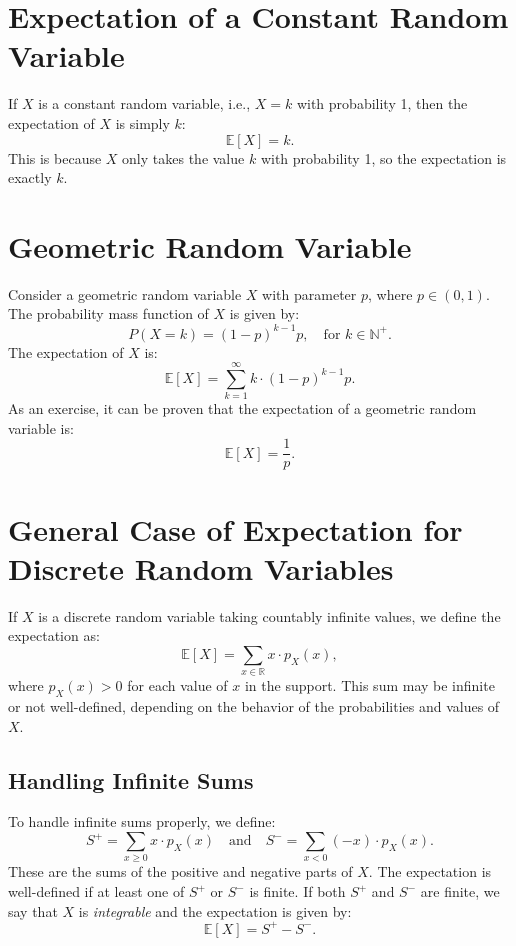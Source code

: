         \section{Expectation of a Constant Random Variable}
    If $X$ is a constant random variable, i.e., $X = k$ with probability 1, then the expectation of $X$ is simply $k$:
    \[
    \mathbb{E}[X] = k.
    \]
    This is because $X$ only takes the value $k$ with probability 1, so the expectation is exactly $k$.
    
    \section{Geometric Random Variable}
    Consider a geometric random variable $X$ with parameter $p$, where $p \in (0, 1)$. The probability mass function of $X$ is given by:
    \[
    P(X = k) = (1 - p)^{k-1} p, \quad \text{for } k \in \mathbb{N}^+.
    \]
    The expectation of $X$ is:
    \[
    \mathbb{E}[X] = \sum_{k=1}^{\infty} k \cdot (1 - p)^{k-1} p.
    \]
    As an exercise, it can be proven that the expectation of a geometric random variable is:
    \[
    \mathbb{E}[X] = \frac{1}{p}.
    \]
    
    \section{General Case of Expectation for Discrete Random Variables}
    If $X$ is a discrete random variable taking countably infinite values, we define the expectation as:
    \[
    \mathbb{E}[X] = \sum_{x \in \mathbb{R}} x \cdot p_X(x),
    \]
    where $p_X(x) > 0$ for each value of $x$ in the support. This sum may be infinite or not well-defined, depending on the behavior of the probabilities and values of $X$.
    
    \subsection{Handling Infinite Sums}
    To handle infinite sums properly, we define:
    \[
    S^+ = \sum_{x \geq 0} x \cdot p_X(x) \quad \text{and} \quad S^- = \sum_{x < 0} (-x) \cdot p_X(x).
    \]
    These are the sums of the positive and negative parts of $X$. The expectation is well-defined if at least one of $S^+$ or $S^-$ is finite. If both $S^+$ and $S^-$ are finite, we say that $X$ is \textit{integrable} and the expectation is given by:
    \[
    \mathbb{E}[X] = S^+ - S^-.
    \]
    
